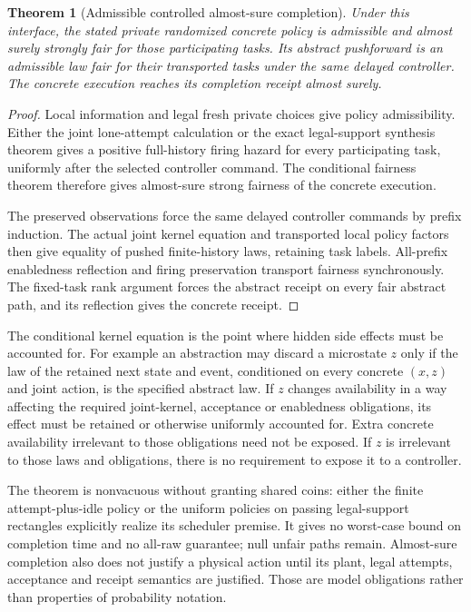 \documentclass[11pt]{article}
\newtheorem{theorem}{Theorem}\newtheorem{proposition}{Proposition}
\begin{document}
\begin{theorem}[Admissible controlled almost-sure completion]
Under this interface, the stated private randomized concrete policy is admissible and almost surely strongly fair for those participating tasks. Its abstract pushforward is an admissible law fair for their transported tasks under the same delayed controller. The concrete execution reaches its completion receipt almost surely.
\end{theorem}
\begin{proof}
Local information and legal fresh private choices give policy admissibility. Either the joint lone-attempt calculation or the exact legal-support synthesis theorem gives a positive full-history firing hazard for every participating task, uniformly after the selected controller command. The conditional fairness theorem therefore gives almost-sure strong fairness of the concrete execution.

The preserved observations force the same delayed controller commands by prefix induction. The actual joint kernel equation and transported local policy factors then give equality of pushed finite-history laws, retaining task labels. All-prefix enabledness reflection and firing preservation transport fairness synchronously. The fixed-task rank argument forces the abstract receipt on every fair abstract path, and its reflection gives the concrete receipt.
\end{proof}

The conditional kernel equation is the point where hidden side effects must be accounted for. For example an abstraction may discard a microstate $z$ only if the law of the retained next state and event, conditioned on every concrete $(x,z)$ and joint action, is the specified abstract law. If $z$ changes availability in a way affecting the required joint-kernel, acceptance or enabledness obligations, its effect must be retained or otherwise uniformly accounted for. Extra concrete availability irrelevant to those obligations need not be exposed. If $z$ is irrelevant to those laws and obligations, there is no requirement to expose it to a controller.

The theorem is nonvacuous without granting shared coins: either the finite attempt-plus-idle policy or the uniform policies on passing legal-support rectangles explicitly realize its scheduler premise. It gives no worst-case bound on completion time and no all-raw guarantee; null unfair paths remain. Almost-sure completion also does not justify a physical action until its plant, legal attempts, acceptance and receipt semantics are justified. Those are model obligations rather than properties of probability notation.
\end{document}
